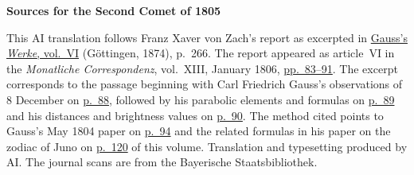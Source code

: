 \clearpage\thispagestyle{empty}
\begin{center}\textbf{Sources for the Second Comet of 1805}\end{center}
\noindent This AI translation follows Franz Xaver von Zach’s report as excerpted in \href{https://gdz.sub.uni-goettingen.de/id/PPN236007467}{Gauss’s \textit{Werke}, vol.~VI} (Göttingen, 1874), p.~266. The report appeared as article~VI in the \textit{Monatliche Correspondenz}, vol.~XIII, January 1806, \href{https://www.digitale-sammlungen.de/en/view/bsb10538605?page=91}{pp.~83--91}. The excerpt corresponds to the passage beginning with Carl Friedrich Gauss’s observations of 8 December on \href{https://www.digitale-sammlungen.de/en/view/bsb10538605?page=96}{p.~88}, followed by his parabolic elements and formulas on \href{https://www.digitale-sammlungen.de/en/view/bsb10538605?page=97}{p.~89} and his distances and brightness values on \href{https://www.digitale-sammlungen.de/en/view/bsb10538605?page=98}{p.~90}. The method cited points to Gauss’s May 1804 paper on \hyperlink{native-99}{p.~94} and the related formulas in his paper on the zodiac of Juno on \hyperlink{native-125}{p.~120} of this volume. Translation and typesetting produced by AI. The journal scans are from the Bayerische Staatsbibliothek.
\clearpage
